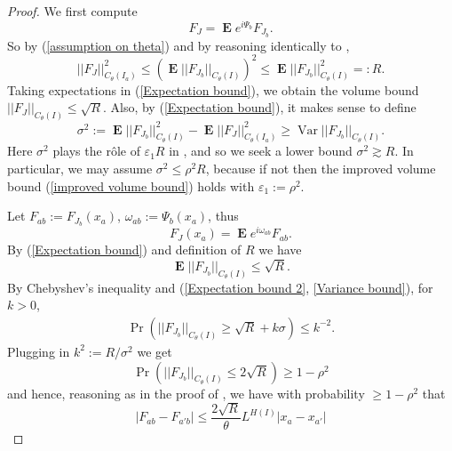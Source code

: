 \documentclass[reqno,10pt]{amsart}
\DeclareMathOperator*{\Expect}{\mathbf E}
\DeclareMathOperator{\Var}{Var}
\newtheorem{lemma}[theorem]{Lemma}
\theoremstyle{definition}
\numberwithin{equation}{section}
\begin{document}
\begin{proof}
We first compute
$$F_J = \Expect e^{i\Psi_b} F_{J_b}.$$
So by (\ref{assumption on theta}) and by reasoning identically to \cite[Lemma 3.3]{Dyatlov_2018},
\begin{equation}\label{Expectation bound}
||F_J||_{C_\theta(I_a)}^2 \leq \left(\Expect ||F_{J_b}||_{C_\theta(I)}\right)^2 \leq \Expect ||F_{J_b}||_{C_\theta(I)}^2 =: R.
\end{equation}
Taking expectations in (\ref{Expectation bound}), we obtain the volume bound $||F_J||_{C_\theta(I)} \leq \sqrt R$.
Also, by (\ref{Expectation bound}), it makes sense to define
\begin{equation}\label{Variance bound}
\sigma^2 := \Expect ||F_{J_b}||_{C_\theta(I)}^2 - \Expect ||F_J||_{C_\theta(I_a)}^2 \geq \Var ||F_{J_b}||_{C_\theta(I)}.
\end{equation}
Here $\sigma^2$ plays the r\^ole of $\varepsilon_1 R$ in \cite[Lemma 3.2]{Dyatlov_2018}, and so we seek a lower bound $\sigma^2 \gtrsim R$.
In particular, we may assume $\sigma^2 \leq \rho^2 R$, because if not then the improved volume bound (\ref{improved volume bound}) holds with $\varepsilon_1 := \rho^2$.



Let $F_{ab} := F_{J_b}(x_a)$, $\omega_{ab} := \Psi_b(x_a)$, thus 
$$F_J(x_a) = \Expect e^{i\omega_{ab}} F_{ab}.$$
By (\ref{Expectation bound}) and definition of $R$ we have 
\begin{equation}\label{Expectation bound 2}
\Expect ||F_{J_b}||_{C_\theta(I)} \leq \sqrt R.
\end{equation}
By Chebyshev's inequality and (\ref{Expectation bound 2}, \ref{Variance bound}), for $k > 0$,
\begin{align*}
\Pr(||F_{J_b}||_{C_\theta(I)} \geq \sqrt R + k\sigma) \leq k^{-2}.
\end{align*}
Plugging in $k^2 := R/\sigma^2$ we get 
$$\Pr(||F_{J_b}||_{C_\theta(I)} \leq 2\sqrt R) \geq 1 - \rho^2$$
and hence, reasoning as in the proof of \cite[Lemma 3.7]{Dyatlov_2018}, we have with probability $\geq 1 - \rho^2$ that
\begin{equation}\label{discrepancy upper bound}
|F_{ab} - F_{a'b}| \leq \frac{2\sqrt R}{\theta} L^{H(I)} |x_a - x_{a'}|
\end{equation}


\end{proof}
\end{document}
